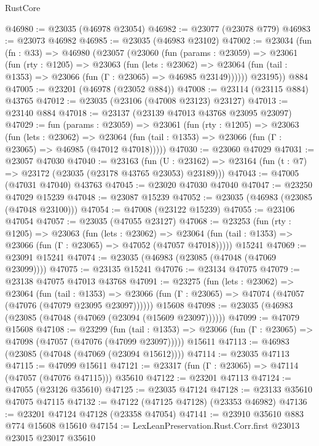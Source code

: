 \begin{lexlean}{RustCore}
\begin{coremodule}
@46980 := @23035 (@46978 @23054)
@46982 := @23077 (@23078 @779)
@46983 := @23073 @46982
@46985 := @23035 (@46983 @23102)
@47002 := @23034
    (fun (fn : @33) =>
    @46980
      (@23057
        (@23060
          (fun (params : @23059) =>
          @23061
            (fun (rty : @1205) =>
            @23063
              (fun (lets : @23062) =>
              @23064 (fun (tail : @1353) => @23066 (fun (Γ : @23065) => @46985 @23149))))))
        @23195))
    @884
@47005 := @23201 (@46978 (@23052 @884))
@47008 := @23114 (@23115 @884) @43765
@47012 := @23035 (@23106 (@47008 @23123) @23127)
@47013 := @23140 @884
@47018 := @23137 (@23139 @47013 @43768 @23095 @23097)
@47029 := fun (params : @23059) =>
  @23061
    (fun (rty : @1205) =>
    @23063
      (fun (lets : @23062) =>
      @23064 (fun (tail : @1353) => @23066 (fun (Γ : @23065) => @46985 (@47012 @47018)))))
@47030 := @23060 @47029
@47031 := @23057 @47030
@47040 := @23163
    (fun (U : @23162) => @23164 (fun (t : @7) => @23172 (@23035 (@23178 @43765 @23053) @23189)))
@47043 := @47005 (@47031 @47040) @43763
@47045 := @23020 @47030 @47040
@47047 := @23250 @47029 @15239
@47048 := @23087 @15239
@47052 := @23035 (@46983 (@23085 (@47048 @23100)))
@47054 := @47008 (@23122 @15239)
@47055 := @23106 @47054
@47057 := @23035 (@47055 @23127)
@47068 := @23253
    (fun (rty : @1205) =>
    @23063
      (fun (lets : @23062) =>
      @23064 (fun (tail : @1353) => @23066 (fun (Γ : @23065) => @47052 (@47057 @47018)))))
    @15241
@47069 := @23091 @15241
@47074 := @23035 (@46983 (@23085 (@47048 (@47069 @23099))))
@47075 := @23135 @15241
@47076 := @23134 @47075
@47079 := @23138 @47075 @47013 @43768
@47091 := @23275
    (fun (lets : @23062) =>
    @23064
      (fun (tail : @1353) =>
      @23066 (fun (Γ : @23065) => @47074 (@47057 (@47076 (@47079 @23095 @23097))))))
    @15608
@47098 := @23035 (@46983 (@23085 (@47048 (@47069 (@23094 (@15609 @23097))))))
@47099 := @47079 @15608
@47108 := @23299
    (fun (tail : @1353) => @23066 (fun (Γ : @23065) => @47098 (@47057 (@47076 (@47099 @23097)))))
    @15611
@47113 := @46983 (@23085 (@47048 (@47069 (@23094 @15612))))
@47114 := @23035 @47113
@47115 := @47099 @15611
@47121 := @23317 (fun (Γ : @23065) => @47114 (@47057 (@47076 @47115))) @35610
@47122 := @23201 @47113
@47124 := @47055 (@23126 @35610)
@47125 := @23035 @47124
@47128 := @23133 @35610 @47075 @47115
@47132 := @47122 (@47125 @47128) (@23353 @46982)
@47136 := @23201 @47124 @47128 (@23358 @47054)
@47141 := @23910 @35610 @883 @774 @15608 @15610
@47154 := LexLeanPreservation.Rust.Corr.first
    @23013
    @23015
    @23017
    @35610

\end{coremodule}
\end{lexlean}
